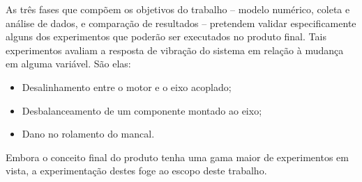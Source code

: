 \documentclass[12pt,openright,twoside,a4paper,
	chapter=TITLE,section=TITLE,
	english,brazil]{abntex2}
\begin{document}
	As três fases que compõem os objetivos do trabalho -- modelo numérico, coleta e análise de dados, e comparação de resultados -- pretendem validar especificamente alguns dos experimentos que poderão ser executados no produto final. Tais experimentos avaliam a resposta de vibração do sistema em relação à mudança em alguma variável. São elas:
	\begin{itemize}
		\setlength{\itemsep}{0pt plus 2pt minus 1pt}
		\item Desalinhamento entre o motor e o eixo acoplado;
		\item Desbalanceamento de um componente montado ao eixo;
		\item Dano no rolamento do mancal.
	\end{itemize}

	Embora o conceito final do produto tenha uma gama maior de experimentos em vista, a experimentação destes foge ao escopo deste trabalho.
	
	\postextual
	
	
		
\end{document}
